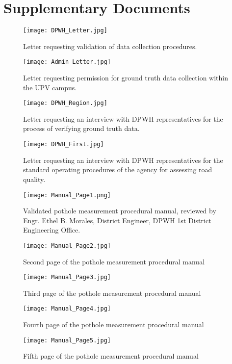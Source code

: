 \chapter{Supplementary Documents}
\label{sec:appendixd}



\begin{figure}[htbp]
	\centering
	\texttt{[image: DPWH\_Letter.jpg]}
	\caption{Letter requesting validation of data collection procedures.}
	\label{fig:validation_letter}
\end{figure}

\begin{figure}[htbp]
	\centering
	\texttt{[image: Admin\_Letter.jpg]}
	\caption{Letter requesting permission for ground truth data collection within the UPV campus.}
	\label{fig:permission_letter}
\end{figure}

\begin{figure}[htbp]
	\centering
	\texttt{[image: DPWH\_Region.jpg]}
	\caption{Letter requesting an interview with DPWH representatives for the process of verifying ground truth data.}
	\label{fig:regional_letter}
\end{figure}

\begin{figure}[htbp]
	\centering
	\texttt{[image: DPWH\_First.jpg]}
	\caption{Letter requesting an interview with DPWH representatives for the standard operating procedures of the agency for assessing road quality.}
	\label{fig:interview_letter}
\end{figure}

\begin{figure}[htbp]
	\centering
	\texttt{[image: Manual\_Page1.png]}
	\caption{Validated pothole measurement procedural manual, reviewed by Engr. Ethel B. Morales, District Engineer, DPWH 1st District Engineering Office.}
	\label{fig:manual_page1}
\end{figure}

\begin{figure}[htbp]
	\centering
	\texttt{[image: Manual\_Page2.jpg]}
	\caption{Second page of the pothole measurement procedural manual}
	\label{fig:manual_page2}
\end{figure}

\begin{figure}[htbp]
	\centering
	\texttt{[image: Manual\_Page3.jpg]}
	\caption{Third page of the pothole measurement procedural manual}
	\label{fig:manual_page3}
\end{figure}

\begin{figure}[htbp]
	\centering
	\texttt{[image: Manual\_Page4.jpg]}
	\caption{Fourth page of the pothole measurement procedural manual}
	\label{fig:manual_page4}
\end{figure}

\begin{figure}[htbp]
	\centering
	\texttt{[image: Manual\_Page5.jpg]}
	\caption{Fifth page of the pothole measurement procedural manual}
	\label{fig:manual_page5}
\end{figure}


